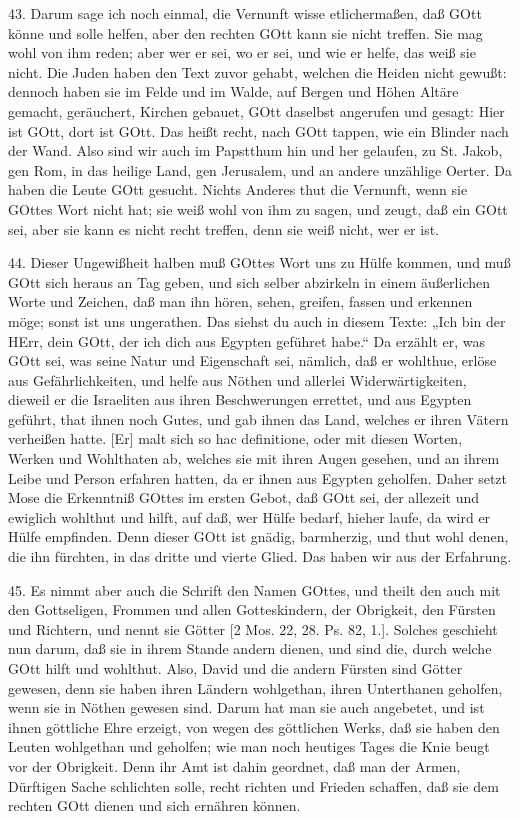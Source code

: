 43. Darum sage ich noch einmal, die Vernunft wisse etlichermaßen, daß GOtt könne und solle helfen, aber den rechten GOtt kann sie nicht treffen. Sie mag wohl von ihm reden; aber wer er sei, wo er sei, und wie er helfe, das weiß sie nicht. Die Juden haben den Text zuvor gehabt, welchen die Heiden nicht gewußt: dennoch haben sie im Felde und im Walde, auf Bergen und Höhen Altäre gemacht, geräuchert, Kirchen gebauet, GOtt daselbst angerufen und gesagt: Hier ist GOtt, dort ist GOtt. Das heißt recht, nach GOtt tappen, wie ein Blinder nach der Wand. Also sind wir auch im Papstthum hin und her gelaufen, zu St. Jakob, gen Rom, in das heilige Land, gen Jerusalem, und an andere unzählige Oerter. Da haben die Leute GOtt gesucht. Nichts Anderes thut die Vernunft, wenn sie GOttes Wort nicht hat; sie weiß wohl von ihm zu sagen, und zeugt, daß ein GOtt sei, aber sie kann es nicht recht treffen, denn sie weiß nicht, wer er ist.

44. Dieser Ungewißheit halben muß GOttes Wort uns zu Hülfe kommen, und muß GOtt sich heraus an Tag geben, und sich selber abzirkeln in einem äußerlichen Worte und Zeichen, daß man ihn hören, sehen, greifen, fassen und erkennen möge; sonst ist uns ungerathen. Das siehst du auch in diesem Texte: „Ich bin der HErr, dein GOtt, der ich dich aus Egypten geführet habe.“ Da erzählt er, was GOtt sei, was seine Natur und Eigenschaft sei, nämlich, daß er wohlthue, erlöse aus Gefährlichkeiten, und helfe aus Nöthen und allerlei Widerwärtigkeiten, dieweil er die Israeliten aus ihren Beschwerungen errettet, und aus Egypten geführt, that ihnen noch Gutes, und gab ihnen das Land, welches er ihren Vätern verheißen hatte. [Er] malt sich so hac definitione, oder mit diesen Worten, Werken und Wohlthaten ab, welches sie mit ihren Augen gesehen, und an ihrem Leibe und Person erfahren hatten, da er ihnen aus Egypten geholfen. Daher setzt Mose die Erkenntniß GOttes im ersten Gebot, daß GOtt sei, der allezeit und ewiglich wohlthut und hilft, auf daß, wer Hülfe bedarf, hieher laufe, da wird er Hülfe empfinden. Denn dieser GOtt ist gnädig, barmherzig, und thut wohl denen, die ihn fürchten, in das dritte und vierte Glied. Das haben wir aus der Erfahrung.

45. Es nimmt aber auch die Schrift den Namen GOttes, und theilt den auch mit den Gottseligen, Frommen und allen Gotteskindern, der Obrigkeit, den Fürsten und Richtern, und nennt sie Götter [2 Mos. 22, 28. Ps. 82, 1.]. Solches
geschieht nun darum, daß sie in ihrem Stande andern dienen, und sind die, durch welche GOtt hilft und wohlthut. Also, David und die andern Fürsten sind Götter gewesen, denn sie haben ihren Ländern wohlgethan, ihren Unterthanen geholfen, wenn sie in Nöthen gewesen sind. Darum hat man sie auch angebetet, und ist ihnen göttliche Ehre erzeigt, von wegen des göttlichen Werks, daß sie haben den Leuten wohlgethan und geholfen; wie man noch heutiges Tages die Knie beugt vor der Obrigkeit. Denn ihr Amt ist dahin geordnet, daß man der Armen, Dürftigen Sache schlichten solle, recht richten und Frieden schaffen, daß sie dem rechten GOtt dienen und sich ernähren können.

